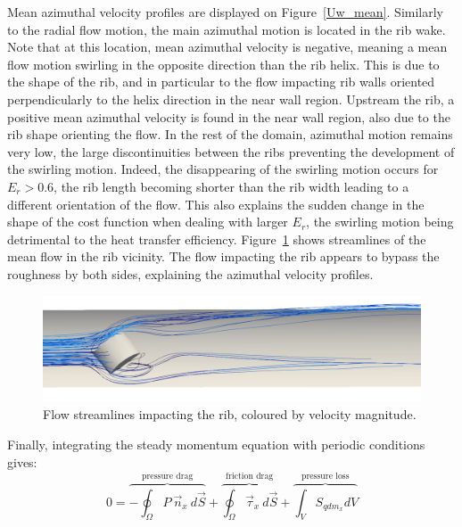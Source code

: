 Mean azimuthal velocity profiles are displayed on Figure~\ref{Uw_mean}. Similarly to the radial flow motion, the main azimuthal motion is located in the rib wake. Note that at this location, mean azimuthal velocity is negative, meaning a mean flow motion swirling in the opposite direction than the rib helix. This is due to the shape of the rib, and in particular to the flow impacting rib walls oriented perpendicularly to the helix direction in the near wall region. Upstream the rib, a positive mean azimuthal velocity is found in the near wall region, also due to the rib shape orienting the flow. In the rest of the domain, azimuthal motion remains very low, the large discontinuities between the ribs preventing the development of the swirling motion. Indeed, the disappearing of the swirling motion occurs for $E_r > 0.6$, the rib length becoming shorter than the rib width leading to a different orientation of the flow. This also explains the sudden change in the shape of the cost function when dealing with larger $E_r$, the swirling motion being detrimental to the heat transfer efficiency. Figure~\ref{streamlines} shows streamlines of the mean flow in the rib vicinity. The flow impacting the rib appears to bypass the roughness by both sides, explaining the azimuthal velocity profiles.\\

\begin{figure}[!h]
\centering
\includegraphics[width=\linewidth]{fig/applications/optim/Streamlines.png}
\caption{Flow streamlines impacting the rib, coloured by velocity magnitude.}
\label{streamlines}
\end{figure}

Finally, integrating the steady momentum equation with periodic conditions gives:
\begin{equation}
0 = \overbrace{- \oint_{\Omega} P ~ \vec{n}_x ~ d\vec{S}}^{\text{pressure drag}} + \overbrace{\oint_{\Omega} \vec{\tau}_x ~ d\vec{S}}^{\text{friction drag}} + \overbrace{\int_V S_{qdm_x} dV}^{\text{pressure loss}}
\label{momentum_eq}
\end{equation}

